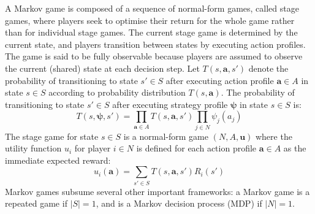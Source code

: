 \documentclass[10pt]{article}
\theoremstyle{plain}
\newcommand{\vect}[1]{\bm{#1}}
\begin{document}
A Markov game is composed of a sequence of normal-form games, called stage games, where players seek to optimise their return for the whole game rather than for individual stage games.
The current stage game is determined by the current state, and players transition between states by executing action profiles.
The game is said to be fully observable because players are assumed to observe the current (shared) state at each decision step.
Let $T(s, \vect{a}, s')$ denote the probability of transitioning to state $s' \in S$ after executing action profile $\vect{a} \in A$ in state $s \in S$ according to probability distribution $T(s, \vect{a})$.
The probability of transitioning to state $s' \in S$ after executing strategy profile $\vect{\psi}$ in state $s \in S$ is:
\begin{equation*}
    T(s, \vect{\psi}, s') = \prod_{\vect{a} \in A} T(s, \vect{a}, s') \prod_{j \in N} \psi_{j}(a_{j})
\end{equation*}
The stage game for state $s \in S$ is a normal-form game $(N, A, \vect{u})$ where the utility function $u_{i}$ for player $i \in N$ is defined for each action profile $\vect{a} \in A$ as the immediate expected reward:
\begin{equation*}
    u_{i}(\vect{a}) = \sum_{s' \in S} T(s, \vect{a}, s') R_{i}(s')
\end{equation*}
Markov games subsume several other important frameworks: a Markov game is a repeated game if $|S| = 1$, and is a Markov decision process (MDP) if $|N| = 1$.
\end{document}
